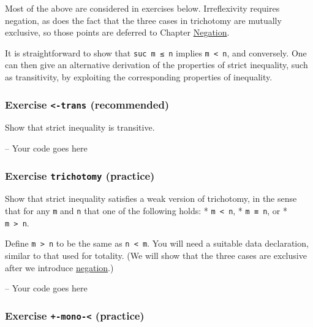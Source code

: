 Most of the above are considered in exercises below. Irreflexivity
requires negation, as does the fact that the three cases in trichotomy
are mutually exclusive, so those points are deferred to Chapter
\protect\hyperlink{Negation}{Negation}.

It is straightforward to show that \texttt{suc\ m\ ≤\ n} implies
\texttt{m\ \textless{}\ n}, and conversely. One can then give an
alternative derivation of the properties of strict inequality, such as
transitivity, by exploiting the corresponding properties of inequality.

\hypertarget{Relations-less-trans}{%
\subsubsection{\texorpdfstring{Exercise \texttt{\textless{}-trans}
(recommended)}{Exercise \textless-trans (recommended)}}\label{Relations-less-trans}}

Show that strict inequality is transitive.

\begin{fence}
\begin{code}
-- Your code goes here
\end{code}
\end{fence}

\hypertarget{Relations-trichotomy}{%
\subsubsection{\texorpdfstring{Exercise \texttt{trichotomy}
(practice)}{Exercise trichotomy (practice)}}\label{Relations-trichotomy}}

Show that strict inequality satisfies a weak version of trichotomy, in
the sense that for any \texttt{m} and \texttt{n} that one of the
following holds: * \texttt{m\ \textless{}\ n}, * \texttt{m\ ≡\ n}, or *
\texttt{m\ \textgreater{}\ n}.

Define \texttt{m\ \textgreater{}\ n} to be the same as
\texttt{n\ \textless{}\ m}. You will need a suitable data declaration,
similar to that used for totality. (We will show that the three cases
are exclusive after we introduce
\protect\hyperlink{Negation}{negation}.)

\begin{fence}
\begin{code}
-- Your code goes here
\end{code}
\end{fence}

\hypertarget{Relations-plus-mono-less}{%
\subsubsection{\texorpdfstring{Exercise \texttt{+-mono-\textless{}}
(practice)}{Exercise +-mono-\textless{} (practice)}}\label{Relations-plus-mono-less}}

